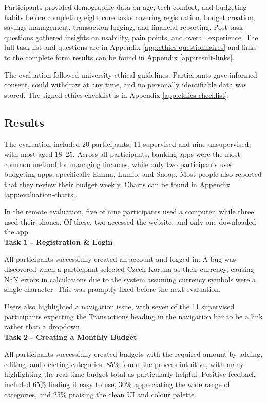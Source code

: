 \documentclass{l4proj}
\begin{document}
Participants provided demographic data on age, tech comfort, and budgeting habits before completing eight core tasks covering registration, budget creation, savings management, transaction logging, and financial reporting. Post-task questions gathered insights on usability, pain points, and overall experience. The full task list and questions are in Appendix \ref{app:ethics-questionnaires} and links to the complete form results can be found in Appendix \ref{app:result-links}.

The evaluation followed university ethical guidelines. Participants gave informed consent, could withdraw at any time, and no personally identifiable data was stored. The signed ethics checklist is in Appendix \ref{app:ethics-checklist}.


\subsection{Results}

The evaluation included 20 participants, 11 supervised and nine unsupervised, with most aged 18–25. Across all participants, banking apps were the most common method for managing finances, while only two participants used budgeting apps, specifically Emma, Lumio, and Snoop. Most people also reported that they review their budget weekly. Charts can be found in Appendix \ref{app:evaluation-charts}.

In the remote evaluation, five of nine participants used a computer, while three used their phones. Of these, two accessed the website, and only one downloaded the app. \\

\textbf{Task 1 - Registration \& Login}

All participants successfully created an account and logged in. A bug was discovered when a participant selected Czech Koruna as their currency, causing NaN errors in calculations due to the system assuming currency symbols were a single character. This was promptly fixed before the next evaluation.  

Users also highlighted a navigation issue, with seven of the 11 supervised participants expecting the Transactions heading in the navigation bar to be a link rather than a dropdown. \\

\textbf{Task 2 - Creating a Monthly Budget}

All participants successfully created budgets with the required amount by adding, editing, and deleting categories. 85\% found the process intuitive, with many highlighting the real-time budget total as particularly helpful. Positive feedback included 65\% finding it easy to use, 30\% appreciating the wide range of categories, and 25\% praising the clean UI and colour palette.  
\end{document}
